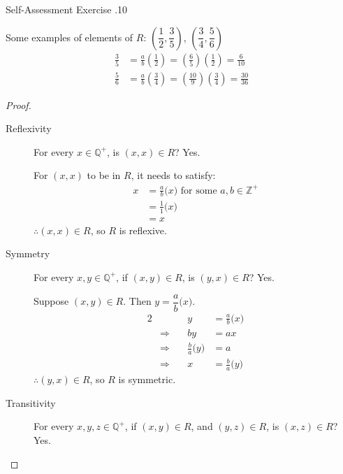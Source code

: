 \documentclass[\main/notes.tex]{subfiles}
\begin{document}
\begin{exercise}{Self-Assessment Exercise \thechapter.10}
\begin{questions}
							\begin{answer}
								Some examples of elements of $R$: $\left(\dfrac{1}{2}, \dfrac{3}{5}\right)$, $\left(\dfrac{3}{4}, \dfrac{5}{6}\right)$
									\begin{align*}
										\frac{3}{5} &= \frac{a}{b}\left(\frac{1}{2}\right) = \left(\frac{6}{5}\right)\left(\frac{1}{2}\right) = \frac{6}{10}\tag*{$a = 6$ and $b = 5$}\\
										\frac{5}{6} &= \frac{a}{b}\left(\frac{3}{4}\right) = \left(\frac{10}{9}\right)\left(\frac{3}{4}\right) = \frac{30}{36}\tag*{$a = 10$ and $b = 9$}
									\end{align*}
								\begin{proof}
									$ $
									\begin{description}
										\item[Reflexivity] For every $x \in \mathbb{Q}^{+}$, is $(x, x) \in R$? Yes.
											\begin{subproof}[Subproof]
												For $(x, x)$ to be in $R$, it needs to satisfy: 
													\begin{align*}
														x &= \frac{a}{b}\bigl(x\bigr) \text{ for some } a, b \in \mathbb{Z}^{+}\\
														&= \frac{1}{1}\bigl(x\bigr) \tag*{$a = 1$ and $b = 1$}\\
														&= x
													\end{align*}
												$\therefore (x, x) \in R$, so $R$ is reflexive.
											\end{subproof}
										\pagebreak
										\item[Symmetry] For every $x, y \in \mathbb{Q}^{+}$, if $(x, y) \in R$, is $(y, x) \in R$? Yes.
											\begin{subproof}[Subproof]
												Suppose $(x, y) \in R$. Then $y = \dfrac{a}{b}\bigl(x\bigr)$.
												\begin{alignat*}{2}
													& &y &= \frac{a}{b}\bigl(x\bigr)\\
													& \Rightarrow \quad & by &= ax\\
													& \Rightarrow \quad & \frac{b}{a}\bigl(y\bigr) &= a\\
													& \Rightarrow \quad & x &= \frac{b}{a}\bigl(y\bigr)
												\end{alignat*}
												$\therefore (y, x) \in R$, so $R$ is symmetric.
											\end{subproof}
										\item[Transitivity] For every $x, y, z \in \mathbb{Q}^{+}$, if $(x, y) \in R$, and $(y, z) \in R$, is $(x, z) \in R$? Yes.

\end{description}
\end{proof}
\end{answer}
\end{questions}
\end{exercise}
\end{document}

